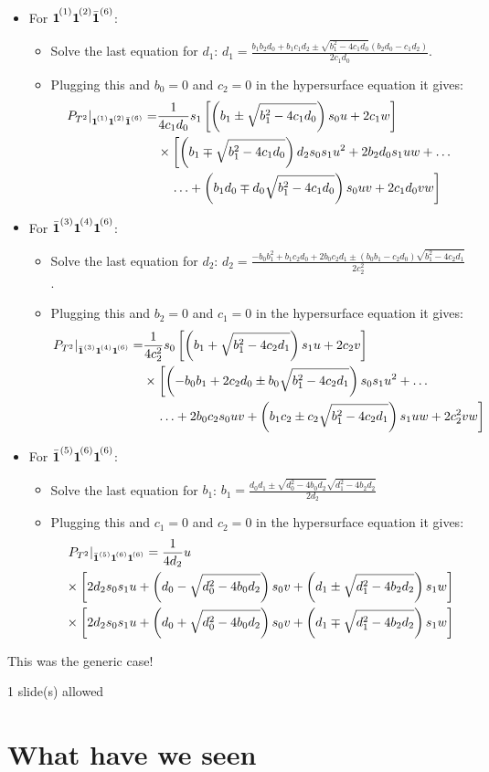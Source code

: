 \documentclass[11pt,a4paper,english]{scrartcl}
\newcommand\mc[1]{{\vphantom{\bar{\boldsymbol{1}}}\boldsymbol{1}}^{\mkern-2mu (#1)}}
\newcommand{\mcb}[1]{\bar{\boldsymbol{1}}^{(#1)}}
\newcommand{\yd}{\mc{1}\mc{2}\mcb{6}}
\newcommand{\ye}{\mcb{3}\mc{4}\mc{6}}
\newcommand{\yfs}{\mcb{5}\mc{6}\mc{6}}
\newcommand{\needSlides}[1]{\newpage \begin{needSl}#1 slide(s) allowed\end{needSl}}
\begin{document}
\begin{itemize}
	\item For $\yd$:
	\begin{itemize}
		\item Solve the last equation for $d_1$: $d_1= \frac{ b_1 b_2 d_0 + b_1 c_1 d_2 \pm \sqrt{b_1^2 - 4 c_1 d_0} (b_2 d_0 - c_1 d_2)}{2 c_1 d_0}$.
		\item Plugging this and $b_0=0$ and $c_2=0$ in the hypersurface equation it gives:
		\begin{align*}
		\left. P_{T^2} \right|_{\yd} = & \frac{1}{4 c_1 d_0} s_1 \left[ \left( b_1 \pm \sqrt{b_1^2 - 4 c_1 d_0} \right) s_0 u + 2 c_1 w \right]\\
		& \times \left[ \left(b_1 \mp \sqrt{b_1^2 - 4 c_1 d_0} \right) d_2 s_0 s_1 u^2+ 2 b_2 d_0 s_1 u w + \ldots \right. \\
		& \quad \left.  \ldots+ \left( b_1 d_0 \mp d_0 \sqrt{b_1^2 - 4 c_1 d_0}\right) s_0 u v + 2 c_1 d_0 v w \right]
		\end{align*}
	\end{itemize}
	
	\item For $\ye$:
	\begin{itemize}
		\item Solve the last equation for $d_2$: $d_2 = \frac{-b_0 b_1^2 + b_1 c_2 d_0 +  2 b_0 c_2 d_1 \pm (b_0 b_1 - c_2 d_0) \sqrt{b_1^2 - 4 c_2 d_1}}{2 c_2^2}$.
		\item Plugging this and $b_2=0$ and $c_1=0$ in the hypersurface equation it gives:
		\begin{align*}
		\left. P_{T^2} \right|_{\ye} = &\frac{1}{4 c_2^2} s_0 \left[ \left( b_1 + \sqrt{b_1^2 - 4 c_2 d_1}\right) s_1 u + 2 c_2 v \right]\\
		  &\times \left[ \left( -b_0 b_1 + 2 c_2 d_0 \pm b_0 \sqrt{b_1^2 - 4 c_2 d_1} \right) s_0 s_1 u^2 + \ldots  \right.\\
		  &  \quad \left.  \ldots + 2 b_0 c_2 s_0 u v + \left( b_1 c_2 \pm c_2 \sqrt{b_1^2 - 4 c_2 d_1} \right) s_1 u w + 2 c_2^2 v w \right]
		\end{align*}
		
	\end{itemize}
	
	\item For $\yfs$:
	\begin{itemize}
		\item Solve the last equation for $b_1$: $b_1 = \frac{d_0 d_1 \pm \sqrt{d_0^2-4b_0d_2}\sqrt{d_1^2-4b_2d_2}}{2d_2}$
		\item Plugging this and $c_1=0$ and $c_2=0$ in the hypersurface equation it gives:
			\begin{align*}
			&\left. P_{T^2} \right|_{\yfs} = \frac{1}{4d_2} u   \\
			 &\times \left[2d_2 s_0s_1u + \left(d_0 - \sqrt{d_0^2-4b_0d_2}\right) s_0 v+ \left( d_1 \pm \sqrt{d_1^2-4b_2d_2} \right) s_1 w \right] \\
			  &\times \left[2d_2 s_0s_1u + \left( d_0 + \sqrt{d_0^2-4b_0d_2}\right) s_0 v+\left( d_1 \mp \sqrt{d^2_1-4b_2d_2} \right) s_1 w \right]
			\end{align*}
	\end{itemize}
\end{itemize}

This was the generic case!

\needSlides{1}
\section{What have we seen}
\end{document}
